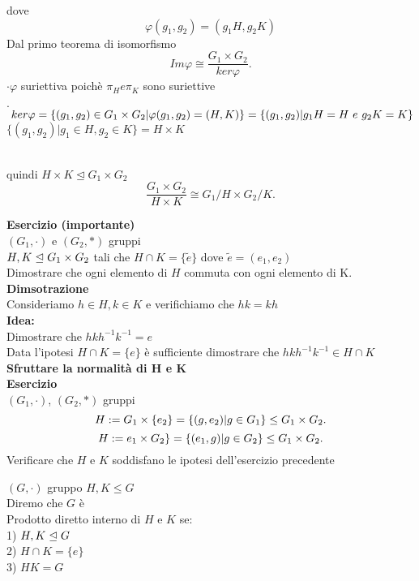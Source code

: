 \documentclass[12px]{article}
\begin{document}
{\begin{dimo}[4,5]
dove 
\[
\varphi(g_1, g_2) = \left( g_1 H, g_2 K \right)
\]
	Dal primo teorema di isomorfismo
	\[
		Im \varphi \cong \frac {G_1\times G_2}{ker \varphi}
	.\] 
	$\cdot \varphi$ suriettiva poichè $\pi_H e \pi_K$ sono suriettive\\
	\begin{aligned*}
	$\cdot$ $\ ker \varphi = \{(g_1,g_2)\in G_1\times G_2| \varphi(g_1,g_2) = (H,K)\} \\= \{(g_1,g_2) | g_1H = H \ e \ g_2K = K\}$ \\
	$\{(g_1,g_2) | g_1\in H,g_2\in K\} = H\times K$
	\end{aligned*}\\
	quindi $H\times K\trianglelefteq G_1\times G_2$
	\[
		\frac{G_1\times G_2}{H\times K}\cong G_1/H\times G_2/K
	.\] 
	\end{dimo}
	\textbf{Esercizio (importante)}\\
	$(G_1,\cdot)$ e $(G_2,*)$ gruppi\\
	$H,K\trianglelefteq G_1\times G_2$ tali che $H\cap K = \{\tilde e\}$ dove  $\tilde e  = (e_1,e_2)$\\
	Dimostrare che ogni elemento di $H$ commuta con ogni elemento di K.\\
	\textbf{Dimsotrazione}\\Consideriamo $h\in H, k\in K$ e verifichiamo che  $hk = kh$\\
	 \textbf{Idea:}\\
	 Dimostrare che $hkh^{-1}k^{-1} = e$\\
	 Data l'ipotesi  $H\cap K = \{e\}$ è sufficiente dimostrare che  $hkh^{-1}k^{-1}\in H\cap K$
	  \textbf{Sfruttare la normalità di H e K}\\
	  \textbf{Esercizio}\\
	  $(G_1,\cdot)$, $(G_2,*)$ gruppi
	  \[
		  H:= G_1\times \{e_2\} = \{(g,e_2)|g\in G_1\}\leq G_1\times G_2\\
	  .\] 
	  \[
		  H:= e_1\times G_2\} = \{(e_1,g)|g\in G_2\}\leq G_1\times G_2\\
	  .\] 
	  Verificare che $H$ e $K$ soddisfano le ipotesi dell'esercizio precedente
	  \begin{defi}
	  	$(G,\cdot)$ gruppo $H,K\leq G$\\
		Diremo che  $G$ è \\
		Prodotto diretto interno di $H$ e $K$ se:\\
		1) $H,K\trianglelefteq G$\\
		2)  $H\cap K = \{e\}$\\
		3)  $HK = G$
	  \end{defi}
}
\end{document}
